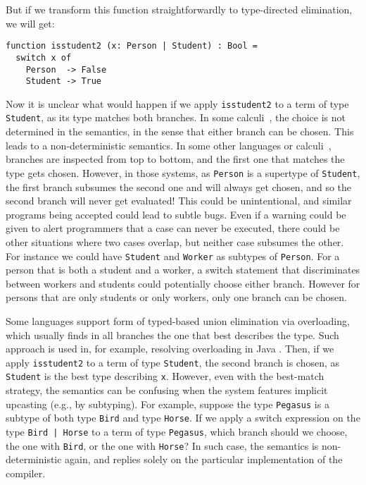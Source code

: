 But if we transform this function straightforwardly to type-directed
elimination, we will get:

\begin{lstlisting}
function isstudent2 (x: Person | Student) : Bool =
  switch x of
    Person  -> False
    Student -> True
\end{lstlisting}

\noindent Now it is unclear what would happen if we apply \lstinline{isstudent2}
to a term of type \lstinline{Student}, as its type matches both branches. In
some calculi~\citep{dunfield2014elaborating}, the choice is not determined in
the semantics, in the sense that either branch can be chosen. This leads to a
non-deterministic semantics. In some other languages or
calculi~\citep{castagna:settheoretic}, branches are inspected from top to
bottom, and the first one that matches the type gets chosen. However, in those
systems, as \lstinline{Person} is a supertype of \lstinline{Student}, the first
branch subsumes the second one and will always get chosen, and so the second
branch will never get evaluated! This could be unintentional, and similar
programs being accepted could lead to subtle bugs. Even if a warning could be
given to alert programmers that a case can never be executed, there could be
other situations where two cases overlap, but neither case subsumes the other.
For instance we could have \lstinline{Student} and \lstinline{Worker} as
subtypes of \lstinline{Person}. For a person that is both a student and a
worker, a switch statement that discriminates between workers and students could
potentially choose either branch. However for persons that are only students or
only workers, only one branch can be chosen.

Some languages support form of typed-based union elimination via overloading,
which usually finds in all branches the one that best describes the type. Such
approach is used in, for example, resolving overloading in Java \cite{javadoc}.
Then, if we apply \lstinline{isstudent2} to a term of type \lstinline{Student},
the second branch is chosen, as \lstinline{Student} is the best type describing
\lstinline{x}. However, even with the best-match strategy, the semantics can be
confusing when the system features implicit upcasting (e.g., by subtyping). For
example, suppose the type \lstinline{Pegasus} is a subtype of both type
\lstinline{Bird} and type \lstinline{Horse}. If we apply a switch expression on
the type \lstinline{Bird | Horse} to a term of type \lstinline{Pegasus}, which
branch should we choose, the one with \lstinline{Bird}, or the one with
\lstinline{Horse}? In such case, the semantics is non-deterministic again, and
replies solely on the particular implementation of the compiler.


